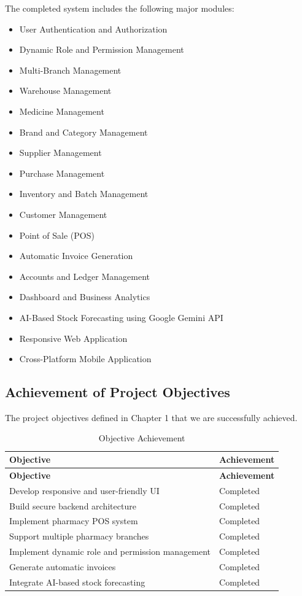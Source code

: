 The completed system includes the following major modules:
\begin{itemize}
\item User Authentication and Authorization
\item Dynamic Role and Permission Management
\item Multi-Branch Management
\item Warehouse Management
\item Medicine Management
\item Brand and Category Management
\item Supplier Management
\item Purchase Management
\item Inventory and Batch Management
\item Customer Management
\item Point of Sale (POS)
\item Automatic Invoice Generation
\item Accounts and Ledger Management
\item Dashboard and Business Analytics
\item AI-Based Stock Forecasting using Google Gemini API
\item Responsive Web Application
\item Cross-Platform Mobile Application
\end{itemize}

\subsection{Achievement of Project Objectives}
The project objectives defined in Chapter 1 that we are successfully achieved.

\small

\begin{longtable}{|p{8cm}|p{6cm}|}
\caption{Objective Achievement} \\
\hline
\textbf{Objective} & \textbf{Achievement} \\
\hline
\endfirsthead

\hline
\textbf{Objective} & \textbf{Achievement} \\
\hline
\endhead

\hline
\endfoot

\hline
\endlastfoot

Develop responsive and user-friendly UI & Completed \\
\hline
Build secure backend architecture & Completed \\
\hline
Implement pharmacy POS system & Completed \\
\hline
Support multiple pharmacy branches & Completed \\
\hline
Implement dynamic role and permission management & Completed \\
\hline
Generate automatic invoices & Completed \\
\hline
Integrate AI-based stock forecasting & Completed \\
\hline

\end{longtable}

